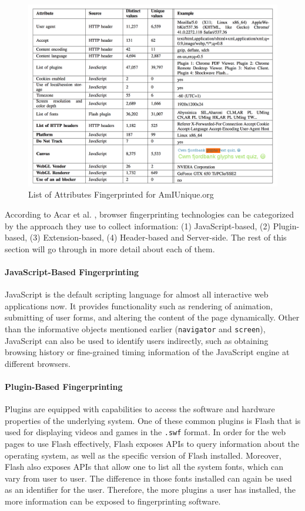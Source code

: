 \documentclass{acm_proc_article-sp}
\begin{document}
\begin{figure}[h]
    \centering
    \includegraphics[width=\textwidth]{assets/amiunique.png}
    \caption{List of Attributes Fingerprinted for AmIUnique.org}
    \label{fig:amiunique}
\end{figure}


According to Acar et al. \cite{acar:fpd}, browser fingerprinting technologies can be categorized by the approach they use to collect information: (1) JavaScript-based, (2) Plugin-based, (3) Extension-based, (4) Header-based and Server-side.
The rest of this section will go through in more detail about each of them.

\paragraph{JavaScript-Based Fingerprinting}
JavaScript is the default scripting language for almost all interactive web applications now. It provides functionality such as rendering of animation, submitting of user forms, and altering the content of the page dynamically. 
Other than the informative objects mentioned earlier (\verb|navigator| and \verb|screen|), JavaScript can also be used to identify users indirectly, such as obtaining browsing history or fine-grained timing information of the JavaScript engine at different browsers.

\paragraph{Plugin-Based Fingerprinting}
Plugins are equipped with capabilities to access the software and hardware properties of the underlying system. One of these common plugins is Flash that is used for displaying videos and games in the \verb|.swf| format. In order for the web pages to use Flash effectively, Flash exposes APIs to query information about the operating system, as well as the specific version of Flash installed.
Moreover, Flash also exposes APIs that allow one to list all the system fonts, which can vary from user to user. The difference in those fonts installed can again be used as an identifier for the user.
Therefore, the more plugins a user has installed, the more information can be exposed to fingerprinting software.
\end{document}
